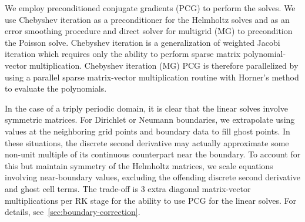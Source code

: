 We employ preconditioned conjugate gradients (PCG) to perform the solves. We use
Chebyshev iteration as a preconditioner for the Helmholtz solves and as an error
smoothing procedure and direct solver for multigrid (MG) to precondition the Poisson
solve. Chebyshev iteration is a generalization of weighted Jacobi iteration which
requires only the ability to perform sparse matrix polynomial-vector multiplication.
Chebyshev iteration (MG) PCG is therefore parallelized by using a parallel sparse
matrix-vector multiplication routine with Horner's method to evaluate the polynomials.

In the case of a triply periodic domain, it is clear that the linear solves involve
symmetric matrices. For Dirichlet or Neumann boundaries, we extrapolate using values at
the neighboring grid points and boundary data to fill ghost points. In these situations,
the discrete second derivative may actually approximate some non-unit multiple of its
continuous counterpart near the boundary. To account for this but maintain symmetry of
the Helmholtz matrices, we scale equations involving near-boundary values, excluding
the offending discrete second derivative and ghost cell terms. The trade-off is 3 extra
diagonal matrix-vector multiplications per RK stage for the ability to use PCG for the
linear solves. For details, see~\ref{sec:boundary-correction}.
